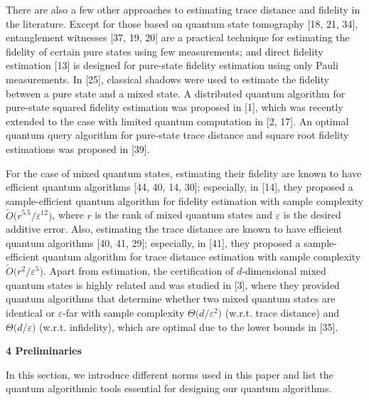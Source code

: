 There are also a few other approaches to estimating trace distance and fidelity in the literature.
Except for those based on quantum state tomography [18, 21, 34], entanglement witnesses [37, 19, 20] are a practical technique for estimating the fidelity of certain pure states using few measurements;
and direct fidelity estimation [13] is designed for pure-state fidelity estimation using only Pauli measurements.
In [25], classical shadows were used to estimate the fidelity between a pure state and a mixed state.
A distributed quantum algorithm for pure-state squared fidelity estimation was proposed in [1], which was recently extended to the case with limited quantum computation in [2, 17].
An optimal quantum query algorithm for pure-state trace distance and square root fidelity estimations was proposed in [39].\par




For the case of mixed quantum states, estimating their fidelity are known to have efficient quantum algorithms [44, 40, 14, 30]; especially, in [14], they proposed a sample-efficient quantum algorithm for fidelity estimation with sample complexity $\widetilde{O}\lparen r^{5.5}/\varepsilon^{12}\rparen$, where $r$ is the rank of mixed quantum states and $\varepsilon$ is the desired additive error.
Also, estimating the trace distance are known to have efficient quantum algorithms [40, 41, 29]; especially, in [41], they proposed a sample-efficient quantum algorithm for trace distance estimation with sample complexity $\widetilde{O}\lparen r^{2}/\varepsilon^{5}\rparen$.
Apart from estimation, the certification of $d$-dimensional mixed quantum states is highly related and was studied in [3], where they provided quantum algorithms that determine whether two mixed quantum states are identical or $\varepsilon$-far with sample complexity $\Theta\lparen d/\varepsilon^{2}\rparen$ (w.r.t. trace distance) and $\Theta\lparen d/\varepsilon\rparen$ (w.r.t. infidelity), which are optimal due to the lower bounds in [35].\par





\par\medskip\noindent\textbf{
4 Preliminaries}\par




In this section, we introduce different norms used in this paper and list the quantum algorithmic tools essential for designing our quantum algorithms.\par




